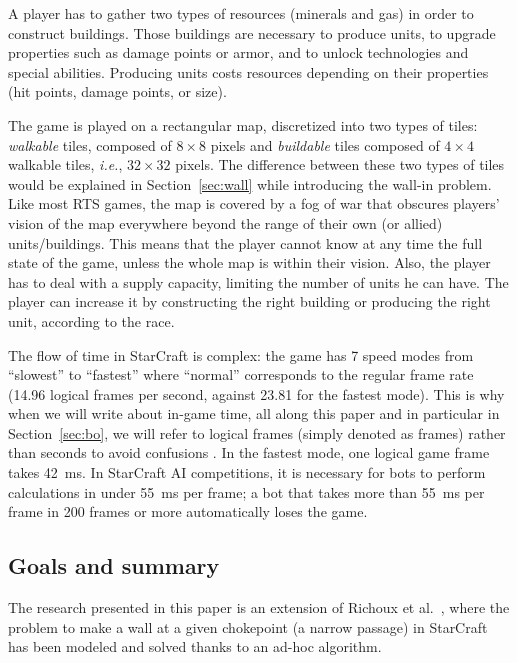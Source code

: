 \documentclass[journal]{IEEEtran}
\newcommand{\minormod}[1]{\color{red} #1\color{black} \xspace}
\newcommand{\ie}{\textit{i.e.}}
\begin{document}
A player  has to  gather two  types of resources (minerals and  gas) in
order   to  construct   buildings. Those buildings are necessary to produce  units, to  upgrade
properties such as damage points or armor, and to unlock technologies
and special abilities. Producing units costs resources depending on their properties (hit points, damage points, or size).

The game  is played on  a rectangular map,  discretized into two  types of
tiles: \emph{walkable}  tiles, composed of  $8 \times  8$ pixels and  \emph{buildable} tiles
composed of $4  \times 4$ walkable tiles, \ie, $32  \times 32$ pixels. The
difference  between these  two types  of tiles  would be  explained in
Section~\ref{sec:wall}  while introducing  the wall-in  problem. Like
most RTS games, the map is covered by 
a fog of war that obscures players’ vision of the map everywhere beyond the range of their
own (or allied) units/buildings.
This means that the player cannot know at any
time the full state of the game, unless the whole map is within their vision.   Also, the player has to deal with a supply capacity, limiting the number of  units he can have. The player
can increase  it by constructing  the right building or  producing the
right unit, according to the race.

The flow of time in StarCraft is complex:  the game has 7  speed modes from
``slowest'' to ``fastest'' where ``normal'' corresponds to the regular
 frame rate  (14.96 logical frames per second, against 23.81 for the fastest mode). This is why when we will  write about in-game time, all along this
paper \minormod{and in particular in Section~\ref{sec:bo}, we will refer to logical frames (simply denoted as frames) rather than
seconds to avoid confusions}. 
In the fastest mode, one logical game  frame takes 42~ms. In StarCraft AI  competitions, 
it is necessary for bots to perform calculations in under 55~ms per frame;
a bot that takes more than 55~ms per frame in 200 frames or more automatically loses
the game.

\subsection{Goals and summary}

The research  presented in this  paper is  an extension of  Richoux et
al.~\cite{RichouxUO14}, where  the problem to  make a wall at  a given
chokepoint (a narrow passage) in StarCraft  has been  modeled  and solved  thanks to  an
ad-hoc algorithm.
\end{document}
